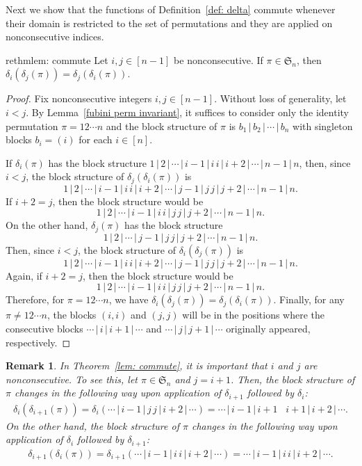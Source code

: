 \documentclass[11pt,reqno]{amsart}
\newcommand{\Sym}{\mathfrak{S}}
\newtheorem{remark}[rethm]{Remark}
\begin{document}
Next we show that the functions of Definition~\ref{def: delta} commute whenever their domain is restricted to the set of permutations and they are applied on nonconsecutive indices.
\begin{restatable}{rethm}{lem: commute}
\label{lem: commute}
Let  $i , j \in [n-1]$ be nonconsecutive. If $\pi \in \Sym_n$, then $\delta_i(\delta_j(\pi)) = \delta_j(\delta_i(\pi))$.
\end{restatable}
\begin{proof}
Fix nonconsecutive integers $i, j \in [n-1]$. 
Without loss of generality, let $i<j$.
By Lemma~\ref{fubini perm invariant}, it suffices to consider only the identity permutation $\pi = 12\cdots n$ and the block structure of $\pi$ is $b_1 \,|\, b_2 \,|\, \cdots \,|\, b_n$ with singleton blocks $b_i = (i)$ for each $i \in [n]$.

If $\delta_i(\pi)$ has the block structure $1\,|\,2\,|\,\cdots\,|\,i-1\,|\,i\,i\,|\,i+2\,|\,\cdots\,|\,n-1\,|\,n$, 
then, since $i < j$, the block structure of $\delta_j(\delta_i(\pi))$ is
\[
1\,|\,2\,|\,\cdots\,|\,i-1\,|\,i\,i\,|\,i+2\,|\,\cdots\,|\,j-1\,|\,j\,j\,|\,j+2\,|\,\cdots\,|\,n-1\,|\,n.
\] 
If $i+2=j$, then the block structure would be
\[
1\,|\,2\,|\,\cdots\,|\,i-1\,|\,i\,i\,|\,j\,j\,|\,j+2\,|\,\cdots\,|\,n-1\,|\,n.
\]
On the other hand, 
$\delta_j(\pi)$ has the block structure \[1\,|\,2\,|\,\cdots\,|\,j-1\,|\,j\,j\,|\,j+2\,|\,\cdots\,|\,n-1\,|\,n.\] 
Then, since $i < j$, the block structure of  $\delta_i(\delta_j(\pi))$ is \[1\,|\,2\,|\,\cdots\,|\,i-1\,|\,i\,i\,|\,i+2\,|\,\cdots\,|\,j-1\,|\,j\,j\,|\,j+2\,|\,\cdots\,|\,n-1\,|\,n.\] 
Again, if $i+2=j$, then the block structure would be
\[1\,|\,2\,|\,\cdots\,|\,i-1\,|\,i\,i\,|\,j\,j\,|\,j+2\,|\,\cdots\,|\,n-1\,|\,n.\]
Therefore, for $\pi = 12\cdots n$, we have $\delta_i(\delta_j(\pi)) = \delta_j(\delta_i(\pi))$. 
Finally, for any $\pi \neq 12\cdots n$, the blocks $(i,i)$ and $(j,j)$ will be in the positions where the consecutive blocks $\cdots\,|\,i\,|\,i+1\,|\,\cdots$ and $\cdots\,|\,j\,|\,j+1\,|\,\cdots$ originally appeared, respectively.
\end{proof}


\begin{remark}
\label{rem:nocommute}
    In Theorem~\ref{lem: commute}, it is important that $i$ and $j$ are nonconsecutive. 
    To see this, let $\pi \in \Sym_n$ and $j=i+1$. 
    Then, the block structure of $\pi$ changes in the following way upon application of $\delta_{i+1}$ followed by $\delta_i$:
    \begin{align}\label{i}
    \delta_i(\delta_{i+1}(\pi))=\delta_i(\cdots\,|\,i-1\,|\,j\,j\,|\,i+2\,|\,\cdots) 
    = \cdots\,|\,i-1\,|\,i+1\,\,\,\,\,i+1\,|\,i+2\,|\,\cdots.
    \end{align}
    On the other hand, 
    the block structure of $\pi$ changes in the following way upon application of $\delta_{i}$ followed by $\delta_{i+1}$:
    \begin{align}
        \delta_{i+1}(\delta_i(\pi))=\delta_{i+1}(\cdots\,|\,i-1\,|\,i\,i\,|\,i+2\,|\,\cdots)=\cdots\,|\,i-1\,|\,i\,i\,|\,i+2\,|\,\cdots.\label{ii} 
    \end{align}
\end{remark}
\end{document}
